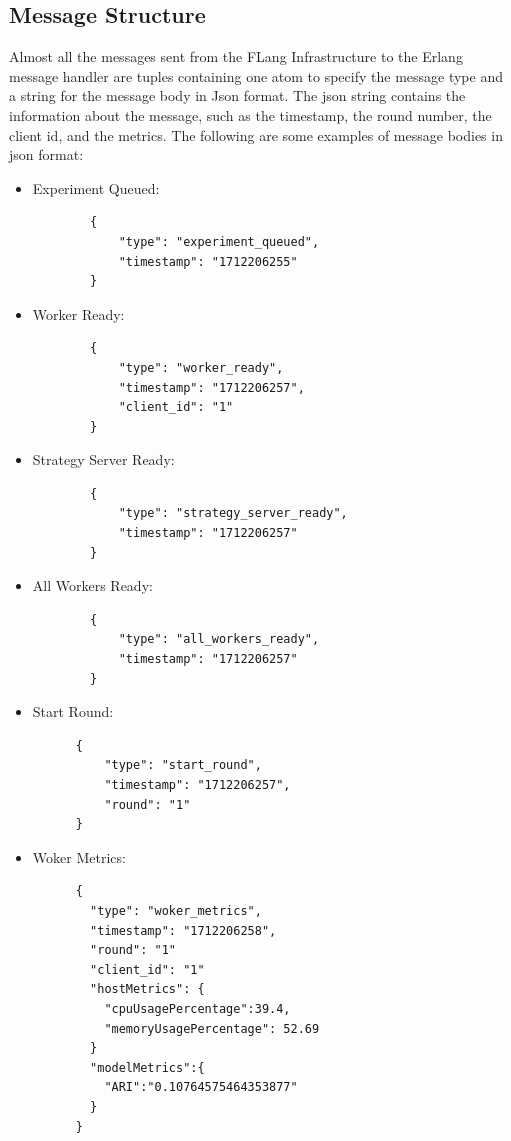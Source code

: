 \subsection{Message Structure}
Almost all the messages sent from the FLang Infrastructure to the Erlang message handler are tuples containing one atom to specify the
message type and a string for the message body in Json format. The json string contains the information about the message, such as the timestamp,
the round number, the client id, and the metrics. The following are some examples of message bodies in json format:
\begin{itemize}
    \item Experiment Queued:
    \begin{verbatim}
        {
            "type": "experiment_queued",
            "timestamp": "1712206255"
        }
    \end{verbatim}

    \item Worker Ready:
    \begin{verbatim}
        {
            "type": "worker_ready",
            "timestamp": "1712206257",
            "client_id": "1"
        }
    \end{verbatim}

    \item Strategy Server Ready:
    \begin{verbatim}
        {
            "type": "strategy_server_ready",
            "timestamp": "1712206257"
        }
    \end{verbatim}

    \item All Workers Ready:
    \begin{verbatim}
        {
            "type": "all_workers_ready",
            "timestamp": "1712206257"
        }
    \end{verbatim}

    \item Start Round:
    \begin{verbatim}
      {
          "type": "start_round",
          "timestamp": "1712206257",
          "round": "1"
      }
    \end{verbatim}

    \newpage

    \item Woker Metrics:
    \begin{verbatim}
      {
        "type": "woker_metrics",
        "timestamp": "1712206258",
        "round": "1"
        "client_id": "1"
        "hostMetrics": {
          "cpuUsagePercentage":39.4,
          "memoryUsagePercentage": 52.69
        }
        "modelMetrics":{
          "ARI":"0.10764575464353877"
        }
      }
    \end{verbatim}


\end{itemize}
